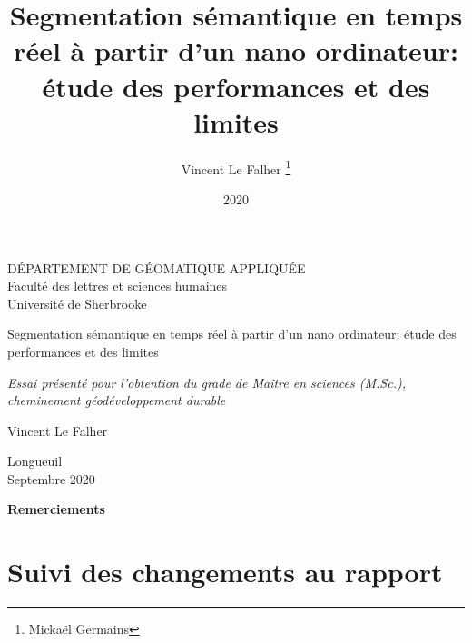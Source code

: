 \documentclass[12pt, letterpaper]{article}
\title{Segmentation sémantique en temps réel à partir d'un nano ordinateur: étude des performances et des limites}
\author{Vincent Le Falher \thanks{Mickaël Germains}}
\date{2020}
\begin{document}
\begin{titlepage} %
   \centering %
 
   \scshape %
  
   DÉPARTEMENT DE GÉOMATIQUE APPLIQUÉE\\Faculté des lettres et sciences humaines\\Université de Sherbrooke
   
   \vspace{11\baselineskip}
 
   {\LARGE Segmentation sémantique en temps réel à partir d'un nano ordinateur: étude des performances et des limites}
   \vspace{1\baselineskip}
   \linebreak
 
   \vspace*{3\baselineskip}
 
   \textit{Essai présenté pour l'obtention du grade de Maître en sciences (M.Sc.),\\cheminement géodéveloppement durable}
   
   \vspace{5\baselineskip}
    
   {\LARGE Vincent Le Falher}
     
   \vfill %
 
   Longueuil\\Septembre 2020 %
   \vfill %
   \tiny{}
 
\end{titlepage}
\thispagestyle{empty}
\textbf{Remerciements}

\newpage
{}
\tableofcontents{}
\listoffigures{}
\listoftables{}
\newpage
{}
\section{Suivi des changements au rapport}

\end{document}
